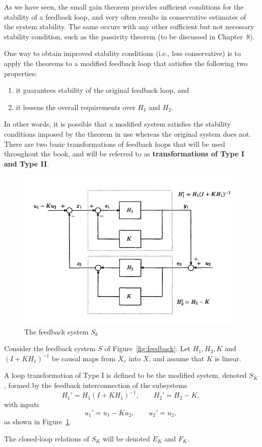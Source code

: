As we have seen, the small gain theorem provides sufficient conditions for the stability of a feedback loop, and very often results in conservative estimates of the system stability.  
The same occurs with any other sufficient but not necessary stability condition, such as the passivity theorem (to be discussed in Chapter~8).  

One way to obtain improved stability conditions (i.e., less conservative) is to apply the theorems to a modified feedback loop that satisfies the following two properties:  

\begin{enumerate}
\item  it guarantees stability of the original feedback loop, and  
\item  it lessens the overall requirements over $H_1$ and $H_2$. 
\end{enumerate}

In other words, it is possible that a modified system satisfies the stability conditions imposed by the theorem in use whereas the original system does not.  
There are two basic transformations of feedback loops that will be used throughout the book, and will be referred to as \textbf{transformations of Type I and Type II}.  

\begin{figure}[h!]
    \centering
    \includegraphics[width=0.8\linewidth]{Images/nonlinear/ipopstability/sk.png}
    \caption{The feedback system $S_k$}
    \label{fig:feedback_sk}
\end{figure}


\begin{definition}
Consider the feedback system $S$ of Figure~\ref{fig:feedback}.  
Let $H_1, H_2, K$ and $(I+KH_1)^{-1}$ be causal maps from $X_e$ into $X$, and assume that $K$ is linear.  

A loop transformation of Type I is defined to be the modified system, denoted $S_K$, formed by the feedback interconnection of the subsystems
\begin{equation}
H_1' = H_1 (I+KH_1)^{-1}, \qquad H_2' = H_2 - K,
\end{equation}
with inputs
\begin{equation}
u_1' = u_1 - Ku_2, \qquad u_2' = u_2,
\end{equation}
as shown in Figure~\ref{fig:feedback_sk}.  

The closed-loop relations of $S_K$ will be denoted $E_K$ and $F_K$.
\end{definition}

